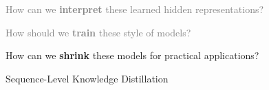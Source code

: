 \documentclass{beamer}
\let\tempone\itemize
\let\temptwo\enditemize
\renewenvironment{itemize}{\tempone\addtolength{\itemsep}{0.5\baselineskip}}{\temptwo}
\newcommand{\air}{\vspace{0.25cm}}
\newcommand{\Cite}[1]{{\footnotesize \citep{#1}}}
\begin{document}



\begin{frame}
  \centerline{}
  \air 
  \air

  \begin{itemize}
  \item \textcolor{gray}{How can we \textbf{interpret} these learned hidden representations? \Cite{Strobelt2016}}
    \air 
  \item  \textcolor{gray}{ How should we \textbf{train} these style of models? \Cite{Wiseman2016a}}
    \air 
  \item How can we \textbf{shrink} these models for practical applications?

    \air 
    \begin{center}
      \alert{Sequence-Level Knowledge Distillation }

      \Cite{Kim2016a} 
    \end{center}

  \end{itemize}
\end{frame}




\end{document}
